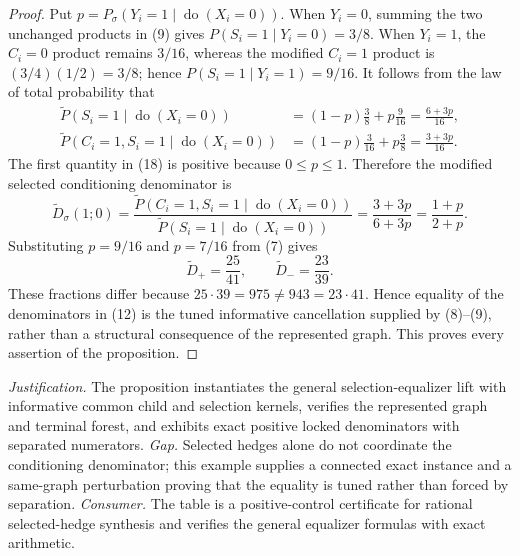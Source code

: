 \documentclass{article}
\begin{document}
\begin{proof}
Put \(p=P_\sigma(Y_i=1\mid\operatorname{do}(X_i=0))\).  When \(Y_i=0\), summing the two unchanged products in (9) gives \(P(S_i=1\mid Y_i=0)=3/8\).  When \(Y_i=1\), the \(C_i=0\) product remains \(3/16\), whereas the modified \(C_i=1\) product is \((3/4)(1/2)=3/8\); hence \(P(S_i=1\mid Y_i=1)=9/16\).  It follows from the law of total probability that
\[
\begin{aligned}
 \widetilde P(S_i=1\mid\operatorname{do}(X_i=0))
 &=(1-p)\frac38+p\frac9{16}=\frac{6+3p}{16},\\
 \widetilde P(C_i=1,S_i=1\mid\operatorname{do}(X_i=0))
 &=(1-p)\frac3{16}+p\frac38=\frac{3+3p}{16}.            \tag{18}
\end{aligned}
\]
The first quantity in (18) is positive because \(0\le p\le1\).  Therefore the modified selected conditioning denominator is
\[
 \widetilde D_\sigma(1;0)
 =\frac{\widetilde P(C_i=1,S_i=1\mid\operatorname{do}(X_i=0))}
        {\widetilde P(S_i=1\mid\operatorname{do}(X_i=0))}
 =\frac{3+3p}{6+3p}=\frac{1+p}{2+p}.                    \tag{19}
\]
Substituting \(p=9/16\) and \(p=7/16\) from (7) gives
\[
 \widetilde D_+=\frac{25}{41},
 \qquad
 \widetilde D_-=\frac{23}{39}.                         \tag{20}
\]
These fractions differ because \(25\cdot39=975\ne943=23\cdot41\).  Hence equality of the denominators in (12) is the tuned informative cancellation supplied by (8)--(9), rather than a structural consequence of the represented graph.  This proves every assertion of the proposition.
\end{proof}
\par\smallskip\noindent \textit{Justification.} The proposition instantiates the general selection-equalizer lift with informative common child and selection kernels, verifies the represented graph and terminal forest, and exhibits exact positive locked denominators with separated numerators. \textit{Gap.} Selected hedges alone do not coordinate the conditioning denominator; this example supplies a connected exact instance and a same-graph perturbation proving that the equality is tuned rather than forced by separation. \textit{Consumer.} The table is a positive-control certificate for rational selected-hedge synthesis and verifies the general equalizer formulas with exact arithmetic.
\end{document}
